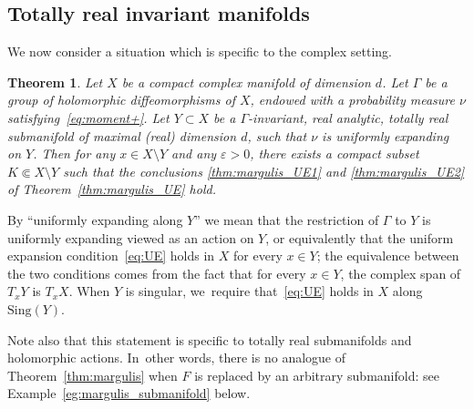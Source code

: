 \documentclass[JEP,XML,SOM,Unicode,published]{cedram}
\let\e\varepsilon
\newcommand{\Sing}{{\mathrm{Sing}}}
\theoremstyle{plain}
\newtheorem{thm}{Theorem}[section]
\theoremstyle{definition}
\begin{document}
\subsection{Totally real invariant manifolds}
We now consider a situation which is specific to the complex setting.

\begin{thm}\label{thm:margulis_totalement_reel}
Let $X$ be a compact complex manifold of dimension $d$. Let $\Gamma$ be a group of holomorphic diffeomorphisms of $X$,
endowed with a probability measure $\nu$ satisfying~\eqref{eq:moment+}. Let $Y\subset X$
be a $\Gamma$-invariant,
real analytic, totally real submanifold of maximal (real) dimension $d$, such that
$\nu$ is uniformly expanding on $Y$.
Then for any
$x\in X\setminus Y$ and any $\e>0$, there exists a compact subset $K\Subset X\setminus Y$ such that the
conclusions \eqref{thm:margulis_UE1} and \eqref{thm:margulis_UE2} of Theorem~\ref{thm:margulis_UE} hold.
\end{thm}

By ``uniformly expanding along $Y$'' we mean that the restriction of $\Gamma$ to $Y$ is
uniformly expanding viewed as an action on $Y$, or equivalently
that the uniform expansion condition~\eqref{eq:UE} holds in $X$ for every $x\in Y$; the equivalence between the two conditions comes from the fact that for every $x\in Y$, the
complex span of $T_xY$ is $T_xX$. When $Y$ is singular, we~require that~\eqref{eq:UE} holds in $X$ along
$\Sing(Y)$.

Note also that this statement is specific to totally real submanifolds and holomorphic actions. In~other words,
there is no analogue of Theorem~\ref{thm:margulis} when $F$ is replaced by an arbitrary submanifold:
see Example~\ref{eg:margulis_submanifold} below.
\end{document}
